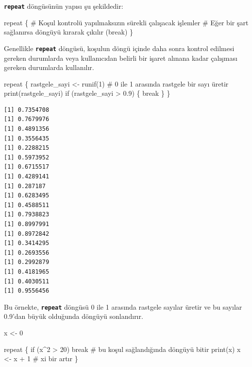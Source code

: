 \documentclass[
  letterpaper,
  DIV=11,
  numbers=noendperiod]{scrreprt}
\newenvironment{Shaded}{\begin{snugshade}}{\end{snugshade}}
\newcommand{\CommentTok}[1]{\textcolor[rgb]{0.37,0.37,0.37}{#1}}
\newcommand{\ControlFlowTok}[1]{\textcolor[rgb]{0.00,0.23,0.31}{#1}}
\newcommand{\DecValTok}[1]{\textcolor[rgb]{0.68,0.00,0.00}{#1}}
\newcommand{\FloatTok}[1]{\textcolor[rgb]{0.68,0.00,0.00}{#1}}
\newcommand{\FunctionTok}[1]{\textcolor[rgb]{0.28,0.35,0.67}{#1}}
\newcommand{\NormalTok}[1]{\textcolor[rgb]{0.00,0.23,0.31}{#1}}
\newcommand{\OtherTok}[1]{\textcolor[rgb]{0.00,0.23,0.31}{#1}}
\newcommand{\SpecialCharTok}[1]{\textcolor[rgb]{0.37,0.37,0.37}{#1}}
\begin{document}
\textbf{\texttt{repeat}} döngüsünün yapısı şu şekildedir:

\begin{Shaded}
\begin{Highlighting}[]
\ControlFlowTok{repeat}\NormalTok{ \{}
  \CommentTok{\# Koşul kontrolü yapılmaksızın sürekli çalışacak işlemler}
  \CommentTok{\# Eğer bir şart sağlanırsa döngüyü kırarak çıkılır (break)}
\NormalTok{\}}
\end{Highlighting}
\end{Shaded}

Genellikle \textbf{\texttt{repeat}} döngüsü, koşulun döngü içinde daha
sonra kontrol edilmesi gereken durumlarda veya kullanıcıdan belirli bir
işaret alınana kadar çalışması gereken durumlarda kullanılır.

\begin{Shaded}
\begin{Highlighting}[]
\ControlFlowTok{repeat}\NormalTok{ \{}
\NormalTok{  rastgele\_sayi }\OtherTok{\textless{}{-}} \FunctionTok{runif}\NormalTok{(}\DecValTok{1}\NormalTok{)  }\CommentTok{\# 0 ile 1 arasında rastgele bir sayı üretir}
  \FunctionTok{print}\NormalTok{(rastgele\_sayi)}
  \ControlFlowTok{if}\NormalTok{ (rastgele\_sayi }\SpecialCharTok{\textgreater{}} \FloatTok{0.9}\NormalTok{) \{}
    \ControlFlowTok{break}
\NormalTok{  \}}
\NormalTok{\}}
\end{Highlighting}
\end{Shaded}

\begin{verbatim}
[1] 0.7354708
[1] 0.7679976
[1] 0.4891356
[1] 0.3556435
[1] 0.2288215
[1] 0.5973952
[1] 0.6715517
[1] 0.4289141
[1] 0.287187
[1] 0.6283495
[1] 0.4588511
[1] 0.7938823
[1] 0.8997991
[1] 0.8972842
[1] 0.3414295
[1] 0.2693556
[1] 0.2992879
[1] 0.4181965
[1] 0.4030511
[1] 0.9556456
\end{verbatim}

Bu örnekte, \textbf{\texttt{repeat}} döngüsü 0 ile 1 arasında rastgele
sayılar üretir ve bu sayılar 0.9'dan büyük olduğunda döngüyü
sonlandırır.

\begin{Shaded}
\begin{Highlighting}[]
\NormalTok{x }\OtherTok{\textless{}{-}} \DecValTok{0}

\ControlFlowTok{repeat}\NormalTok{ \{}
    \ControlFlowTok{if}\NormalTok{ (x}\SpecialCharTok{\^{}}\DecValTok{2} \SpecialCharTok{\textgreater{}} \DecValTok{20}\NormalTok{) }\ControlFlowTok{break}     \CommentTok{\# bu koşul sağlandığında döngüyü bitir}
    \FunctionTok{print}\NormalTok{(x)               }
\NormalTok{    x }\OtherTok{\textless{}{-}}\NormalTok{ x }\SpecialCharTok{+} \DecValTok{1}              \CommentTok{\# x\textquotesingle{}i bir artır}
\NormalTok{\}}
\end{Highlighting}
\end{Shaded}
\end{document}
